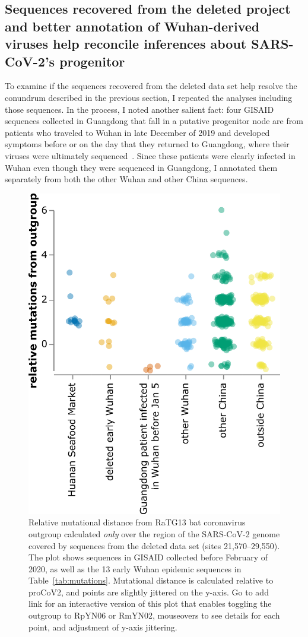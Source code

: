 \documentclass[9pt,twocolumn,twoside]{gsajnl_modified}
\begin{document}
\subsection{Sequences recovered from the deleted project and better annotation of Wuhan-derived viruses help reconcile inferences about SARS-CoV-2's progenitor}
To examine if the sequences recovered from the deleted data set help resolve the conundrum described in the previous section, I repeated the analyses including those sequences.
In the process, I noted another salient fact: four GISAID sequences collected in Guangdong that fall in a putative progenitor node are from patients who traveled to Wuhan in late December of 2019 and developed symptoms before or on the day that they returned to Guangdong, where their viruses were ultimately sequenced~\citep{chan2020familial, kang2020evidence}.
Since these patients were clearly infected in Wuhan even though they were sequenced in Guangdong, I annotated them separately from both the other Wuhan and other China sequences.

\begin{figure}
\centering
\includegraphics[width=0.75\linewidth]{figures/deltadist_jitter.png}
\caption{
Relative mutational distance from RaTG13 bat coronavirus outgroup calculated \emph{only} over the region of the SARS-CoV-2 genome covered by sequences from the deleted data set (sites 21,570--29,550).
The plot shows sequences in GISAID collected before February of 2020, as well as the 13 early Wuhan epidemic sequences in Table~\ref{tab:mutations}.
Mutational distance is calculated relative to proCoV2, and points are slightly jittered on the y-axis.
Go to {\color{red} add link} for an interactive version of this plot that enables toggling the outgroup to RpYN06 or RmYN02, mouseovers to see details for each point, and adjustment of y-axis jittering.
\label{fig:deltadist_jitter}
}
\end{figure}
\end{document}
